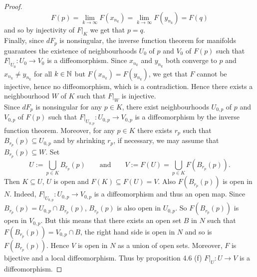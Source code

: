 \begin{proof}
	\begin{equation*}
		F(p) = \lim_{k \to \infty} F(x_{n_k}) = \lim_{k \to \infty}F(y_{n_k}) = F(q)
	\end{equation*}
	\noindent and so by injectivity of $F\vert_K$ we get that $p = q$.\\
	Finally, since $dF_p$ is nonsingular, the inverse function theorem for manifolds \cite[79]{lee:smooth_manifolds:2013} guarantees the existence of neighbourhoods $U_0$ of $p$ and $V_0$ of $F(p)$ such that $F\vert_{U_0} : U_0 \to V_0$ is a diffeomorphism. Since $x_{n_k}$ and $y_{n_k}$ both converge to $p$ and $x_{n_k} \neq y_{n_k}$ for all $k \in \mathbb{N}$ but $F(x_{n_k}) = F(y_{n_k})$, we get that $F$ cannot be injective, hence no diffeomorphism, which is a contradiction. Hence there exists a neighbourhood $W$ of $K$ such that $F\vert_W$ is injective.\\
	Since $dF_p$ is nonsingular for any $p \in K$, there exist neighbourhoods $U_{0,p}$ of $p$ and $V_{0,p}$ of $F(p)$ such that $F\vert_{U_{0,p}} : U_{0,p} \to V_{0,p}$ is a diffeomorphism by the inverse function theorem. Moreover, for any $p \in K$ there exists $r_p$ such that $B_{r_p}(p) \subseteq U_{0,p}$ and by shrinking $r_p$, if necessary, we may assume that $B_{r_p}(p) \subseteq W$. Set
	\begin{equation*}
		U := \bigcup_{p \in K} B_{r_p}(p) \qquad \text{and} \qquad V := F(U) = \bigcup_{p \in K} F(B_{r_p}(p)).
	\end{equation*}
	\noindent Then $K \subseteq U$, $U$ is open and $F(K) \subseteq F(U) = V$. Also $F(B_{r_p}(p))$ is open in $N$. Indeed, $F\vert_{U_{0,p}} : U_{0,p} \to V_{0,p}$ is a diffeomorphism and thus an open map. Since $B_{r_p}(p) = U_{0,p} \cap B_{r_p}(p)$, $B_{r_p}(p)$ is also open in $U_{0,p}$. So $F(B_{r_p}(p))$ is open in $V_{0,p}$. But this means that there exists an open set $B$ in $N$ such that $F(B_{r_p}(p)) = V_{0,p} \cap B$, the right hand side is open in $N$ and so is $F(B_{r_p}(p))$. Hence $V$ is open in $N$ as a union of open sets. Moreover, $F$ is bijective and a local diffeomorphism. Thus by proposition 4.6 (f) \cite[80]{lee:smooth_manifolds:2013} $F\vert_U : U \to V$ is a diffeomorphism.
\end{proof}


